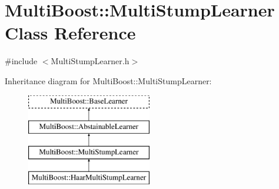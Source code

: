 \hypertarget{classMultiBoost_1_1MultiStumpLearner}{
\section{MultiBoost::MultiStumpLearner Class Reference}
\label{classMultiBoost_1_1MultiStumpLearner}
}


{\ttfamily \#include $<$MultiStumpLearner.h$>$}

Inheritance diagram for MultiBoost::MultiStumpLearner:\begin{figure}[H]
\begin{center}
\leavevmode
\includegraphics[height=4.000000cm]{classMultiBoost_1_1MultiStumpLearner}
\end{center}
\end{figure}
